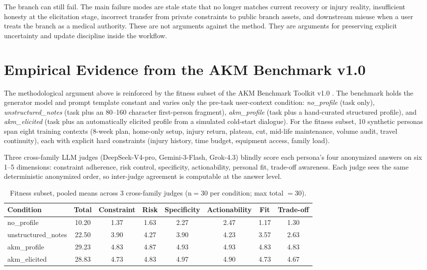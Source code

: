 \documentclass[11pt]{article}
\begin{document}
The branch can still fail. The main failure modes are stale state that no longer matches current recovery or injury reality, insufficient honesty at the elicitation stage, incorrect transfer from private constraints to public branch assets, and downstream misuse when a user treats the branch as a medical authority. These are not arguments against the method. They are arguments for preserving explicit uncertainty and update discipline inside the workflow.
\section{Empirical Evidence from the AKM Benchmark v1.0}
\label{sec:empirical}

The methodological argument above is reinforced by the fitness subset of the AKM Benchmark Toolkit v1.0 \citep{shao2026akm}. The benchmark holds the generator model and prompt template constant and varies only the pre-task user-context condition: \textit{no\_profile} (task only), \textit{unstructured\_notes} (task plus an 80--160 character first-person fragment), \textit{akm\_profile} (task plus a hand-curated structured profile), and \textit{akm\_elicited} (task plus an automatically elicited profile from a simulated cold-start dialogue). For the fitness subset, 10 synthetic personas span eight training contexts (8-week plan, home-only setup, injury return, plateau, cut, mid-life maintenance, volume audit, travel continuity), each with explicit hard constraints (injury history, time budget, equipment access, family load).

Three cross-family LLM judges (DeepSeek-V4-pro, Gemini-3-Flash, Grok-4.3) blindly score each persona's four anonymized answers on six 1--5 dimensions: constraint adherence, risk control, specificity, actionability, personal fit, trade-off awareness. Each judge sees the same deterministic anonymized order, so inter-judge agreement is computable at the answer level.

\begin{table}[htbp]
\centering
\caption{Fitness subset, pooled means across 3 cross-family judges (n${=}$30 per condition; max total ${=}30$).}
\label{tab:fitness_pooled}
\small
\begin{tabular}{lccccccc}
\toprule
Condition & Total & Constraint & Risk & Specificity & Actionability & Fit & Trade-off \\
\midrule
no\_profile          & 10.20 & 1.37 & 1.63 & 2.27 & 2.47 & 1.17 & 1.30 \\
unstructured\_notes  & 22.50 & 3.90 & 4.27 & 3.90 & 4.23 & 3.57 & 2.63 \\
akm\_profile         & 29.23 & 4.83 & 4.87 & 4.93 & 4.93 & 4.83 & 4.83 \\
akm\_elicited        & 28.83 & 4.73 & 4.83 & 4.97 & 4.90 & 4.73 & 4.67 \\
\bottomrule
\end{tabular}
\end{table}
\end{document}
